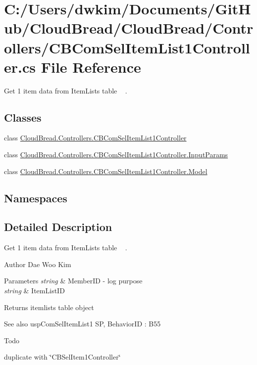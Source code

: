 \hypertarget{a00201}{}\section{C\+:/\+Users/dwkim/\+Documents/\+Git\+Hub/\+Cloud\+Bread/\+Cloud\+Bread/\+Controllers/\+C\+B\+Com\+Sel\+Item\+List1\+Controller.cs File Reference}
\label{a00201}


Get 1 item data from Item\+Lists table ~\newline
.  


\subsection*{Classes}
\begin{DoxyCompactItemize}
\item 
class \hyperlink{a00028}{Cloud\+Bread.\+Controllers.\+C\+B\+Com\+Sel\+Item\+List1\+Controller}
\item 
class \hyperlink{a00122}{Cloud\+Bread.\+Controllers.\+C\+B\+Com\+Sel\+Item\+List1\+Controller.\+Input\+Params}
\item 
class \hyperlink{a00149}{Cloud\+Bread.\+Controllers.\+C\+B\+Com\+Sel\+Item\+List1\+Controller.\+Model}
\end{DoxyCompactItemize}
\subsection*{Namespaces}
\begin{DoxyCompactItemize}
\end{DoxyCompactItemize}


\subsection{Detailed Description}
Get 1 item data from Item\+Lists table ~\newline
. 

\begin{DoxyAuthor}{Author}
Dae Woo Kim 
\end{DoxyAuthor}

\begin{DoxyParams}{Parameters}
{\em string} & Member\+ID -\/ log purpose \\
\hline
{\em string} & Item\+List\+ID \\
\hline
\end{DoxyParams}
\begin{DoxyReturn}{Returns}
itemlists table object 
\end{DoxyReturn}
\begin{DoxySeeAlso}{See also}
usp\+Com\+Sel\+Item\+List1 SP, Behavior\+ID \+: B55 
\end{DoxySeeAlso}
\begin{DoxyRefDesc}{Todo}
\item[\hyperlink{a00001__todo000002}{Todo}]duplicate with \char`\"{}\+C\+B\+Sel\+Item1\+Controller\char`\"{} \end{DoxyRefDesc}
